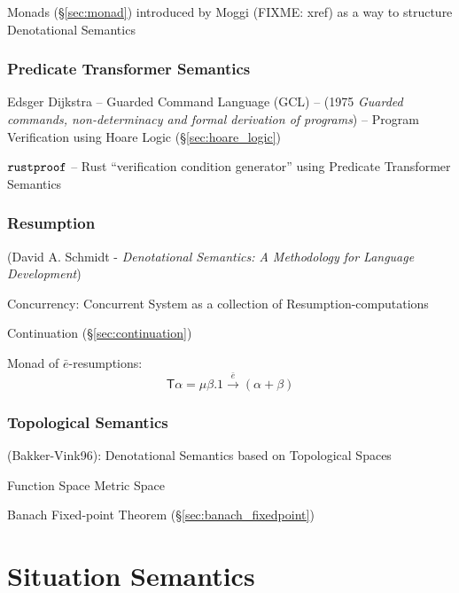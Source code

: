 \fist Monads (\S\ref{sec:monad}) introduced by Moggi (FIXME: xref) as a way to
structure Denotational Semantics



\subsubsection{Predicate Transformer Semantics}
\label{sec:predicate_transformer_semantics}

Edsger Dijkstra -- Guarded Command Language (GCL) -- (1975
\emph{Guarded commands, non-determinacy and formal derivation of
  programs}) -- Program Verification using Hoare Logic
(\S\ref{sec:hoare_logic})

$\mathtt{rustproof}$ -- Rust ``verification condition generator'' using
Predicate Transformer Semantics



\subsubsection{Resumption}\label{sec:resumption}

(David A. Schmidt - \emph{Denotational Semantics: A Methodology for
  Language Development}) %

Concurrency: Concurrent System as a collection of
Resumption-computations \cite{filinski99}

Continuation (\S\ref{sec:continuation})

Monad of $\bar{e}$-resumptions: \cite{filinski99} %
\[
  \mathsf{T}\alpha = \mu \beta. 1 \xrightarrow{\bar{e}} (\alpha + \beta)
\]



\subsubsection{Topological Semantics}\label{sec:topological_semantics}

(Bakker-Vink96): Denotational Semantics based on Topological Spaces

Function Space Metric Space %

Banach Fixed-point Theorem (\S\ref{sec:banach_fixedpoint})



\section{Situation Semantics}\label{sec:situation_semantics}

